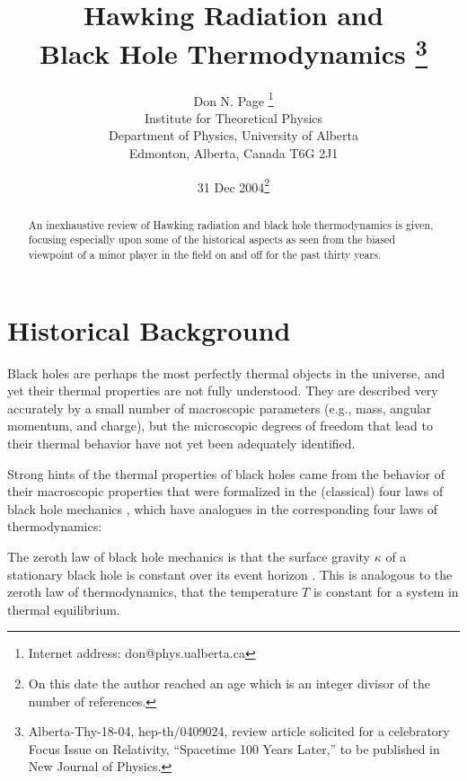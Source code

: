 \documentclass[12pt]{article} \usepackage{latexsym}
\begin{document}
\title{{\bf Hawking Radiation and \\ Black Hole Thermodynamics}
\thanks{Alberta-Thy-18-04, hep-th/0409024, review article solicited for
a celebratory Focus Issue on Relativity, ``Spacetime 100 Years
Later,'' to be published in New Journal of Physics.}}

\author{
Don N. Page
\thanks{Internet address:
don@phys.ualberta.ca}
\\
Institute for Theoretical Physics\\
Department of Physics, University of Alberta\\
Edmonton, Alberta, Canada T6G 2J1
}
\date{31 Dec 2004\thanks{On this date the author reached an age which is an integer
divisor of the number of references.}}
\maketitle

\begin{abstract}

An inexhaustive review of Hawking radiation and black hole
thermodynamics is given, focusing especially upon some of the
historical aspects as seen from the biased viewpoint of a minor player
in the field on and off for the past thirty years.

\end{abstract}
\normalsize

\newpage

\section{Historical Background}

Black holes are perhaps the most perfectly thermal objects in the
universe, and yet their thermal properties are not fully understood.
They are described very accurately by a small number of macroscopic
parameters (e.g., mass, angular momentum, and charge), but the
microscopic degrees of freedom that lead to their thermal behavior
have not yet been adequately identified.

Strong hints of the thermal properties of black holes came from the
behavior of their macroscopic properties that were formalized in the
(classical) four laws of black hole mechanics \cite{BCH}, which have
analogues in the corresponding four laws of thermodynamics:

The zeroth law of black hole mechanics is that the surface gravity
$\kappa$ of a stationary black hole is constant over its event horizon
\cite{Carter,BCH}.  This is analogous to the zeroth law of
thermodynamics, that the temperature $T$ is constant for a system in
thermal equilibrium.
\end{document}
